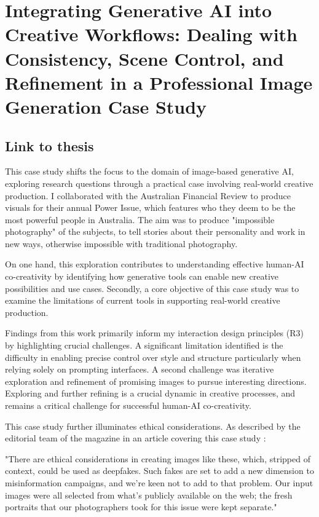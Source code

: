 \chapter{Integrating Generative AI into Creative Workflows: Dealing with Consistency, Scene Control, and Refinement in a Professional Image Generation Case Study} \label{c:tc6} 

\section{Link to thesis}

This case study shifts the focus to the domain of image-based generative AI, exploring research questions through a practical case involving real-world creative production. I collaborated with the Australian Financial Review to produce visuals for their annual Power Issue, which features who they deem to be the most powerful people in Australia. The aim was to produce "impossible photography" of the subjects, to tell stories about their personality and work in new ways, otherwise impossible with traditional photography. 

On one hand, this exploration contributes to understanding effective human-AI co-creativity by identifying how generative tools can enable new creative possibilities and use cases. Secondly, a core objective of this case study was to examine the limitations of current tools in supporting real-world creative production. 

Findings from this work primarily inform my interaction design principles (R3) by highlighting crucial challenges. A significant limitation identified is the difficulty in enabling precise control over style and structure particularly when relying solely on prompting interfaces. A second challenge was iterative exploration and refinement of promising images to pursue interesting directions. Exploring and further refining is a crucial dynamic in creative processes, and remains a critical challenge for successful human-AI co-creativity.

This case study further illuminates ethical considerations. As described by the editorial team of the magazine in an article covering this case study \cite{Drummond2023-bh}:

"There are ethical considerations in creating images like these, which, stripped of context, could be used as deepfakes. Such fakes are set to add a new dimension to misinformation campaigns, and we're keen not to add to that problem. Our input images were all selected from what's publicly available on the web; the fresh portraits that our photographers took for this issue were kept separate."

